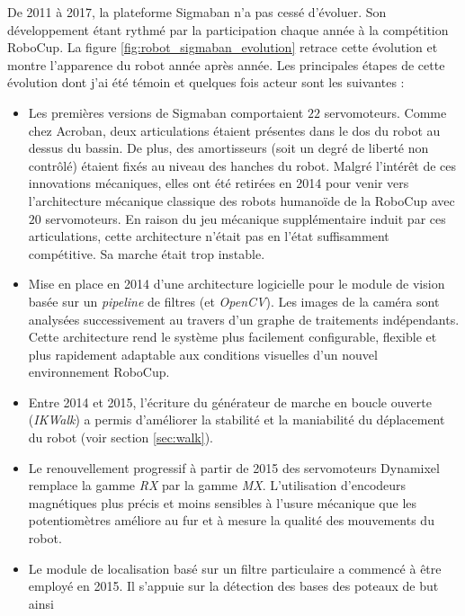De 2011 à 2017, la plateforme Sigmaban n'a pas cessé d'évoluer.
Son développement étant rythmé par la participation chaque année 
à la compétition RoboCup.
La figure \ref{fig:robot_sigmaban_evolution} retrace cette évolution et montre
l'apparence du robot année après année.
Les principales étapes de cette évolution dont j'ai été témoin et 
quelques fois acteur sont les suivantes :
\begin{itemize}
    \item Les premières versions de Sigmaban comportaient $22$ servomoteurs.
        Comme chez Acroban, deux articulations étaient présentes dans le dos
        du robot au dessus du bassin. 
        De plus, des amortisseurs (soit un degré de liberté non contrôlé) étaient 
        fixés au niveau des hanches du robot.
        Malgré l'intérêt de ces innovations mécaniques, elles ont été
        retirées en 2014 pour venir vers l'architecture mécanique \og classique \fg
        des robots humanoïde de la RoboCup avec $20$ servomoteurs.
        En raison du jeu mécanique supplémentaire induit par ces articulations, 
        cette architecture n'était pas en l'état suffisamment compétitive. 
        Sa marche était trop instable.
    \item Mise en place en 2014 d'une architecture logicielle pour le module de vision 
        basée sur un \textit{pipeline} de filtres (et \textit{OpenCV}).
        Les images de la caméra sont analysées successivement au travers d'un graphe 
        de traitements indépendants.
        Cette architecture rend le système plus facilement configurable, flexible
        et plus rapidement adaptable aux conditions visuelles d'un 
        nouvel environnement RoboCup.
    \item Entre 2014 et 2015, l'écriture du générateur de marche en boucle ouverte
        (\textit{IKWalk}) a permis d'améliorer la stabilité et la maniabilité 
        du déplacement du robot (voir section \ref{sec:walk}).
    \item Le renouvellement progressif à partir de 2015 des servomoteurs Dynamixel  
        remplace la gamme \textit{RX} par la gamme \textit{MX}.
        L'utilisation d'encodeurs magnétiques plus précis et moins sensibles 
        à l'usure mécanique que les potentiomètres améliore au fur et à mesure 
        la qualité des mouvements du robot.
    \item Le module de localisation basé sur un filtre particulaire 
        a commencé à être employé en 2015.
        Il s'appuie sur la détection des bases des poteaux de but ainsi 

\end{itemize}
